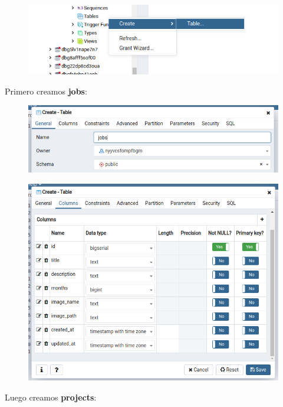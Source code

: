 \documentclass{article}
\begin{document}
\begin{figure}[h!]
  \centering
  \includegraphics[scale=0.5]{./Pictures/276_create_tables.png}
\end{figure}

Primero creamos \textbf{jobs}:

\begin{figure}[h!]
  \centering
  \includegraphics[scale=0.5]{./Pictures/277_jobs.png}
\end{figure}

\begin{figure}[h!]
  \centering
  \includegraphics[scale=0.5]{./Pictures/278_jobs.png}
\end{figure}

Luego creamos \textbf{projects}:
\end{document}
